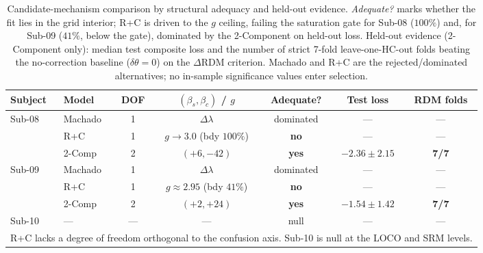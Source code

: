 \documentclass{article}
\begin{document}
\begin{table}[h]
  \caption{Candidate-mechanism comparison by structural adequacy and held-out evidence. \emph{Adequate?} marks whether the fit lies in the grid interior; R+C is driven to the $g$ ceiling, failing the saturation gate for Sub-08 ($100\%$) and, for Sub-09 ($41\%$, below the gate), dominated by the 2-Component on held-out loss. Held-out evidence (2-Component only): median test composite loss and the number of strict 7-fold leave-one-HC-out folds beating the no-correction baseline ($\delta\theta{=}0$) on the $\Delta$RDM criterion. Machado and R+C are the rejected/dominated alternatives; no in-sample significance values enter selection.}
  \label{tab:full}
  \begin{center}
    \begin{small}
      \begin{tabular}{llccccc}
        \toprule
        Subject & Model & DOF & $(\beta_s, \beta_c)$ / $g$ & Adequate? & Test loss & RDM folds \\
        \midrule
        \multirow{3}{*}{Sub-08} & Machado & 1 & $\Delta\lambda$ & dominated & --- & --- \\
        & R+C & 1 & $g{\to}3.0$ (bdy $100\%$) & \textbf{no} & --- & --- \\
        & 2-Comp & 2 & $(+6, -42)$ & \textbf{yes} & $-2.36 \pm 2.15$ & \textbf{7/7} \\
        \midrule
        \multirow{3}{*}{Sub-09} & Machado & 1 & $\Delta\lambda$ & dominated & --- & --- \\
        & R+C & 1 & $g{\approx}2.95$ (bdy $41\%$) & \textbf{no} & --- & --- \\
        & 2-Comp & 2 & $(+2, +24)$ & \textbf{yes} & $-1.54 \pm 1.42$ & \textbf{7/7} \\
        \midrule
        Sub-10 & --- & --- & --- & null & --- & --- \\
        \bottomrule
        \multicolumn{7}{p{0.92\columnwidth}}{\small R+C lacks a degree of freedom orthogonal to the confusion axis. Sub-10 is null at the LOCO and SRM levels.} \\
      \end{tabular}
    \end{small}
  \end{center}
\end{table}
\end{document}
